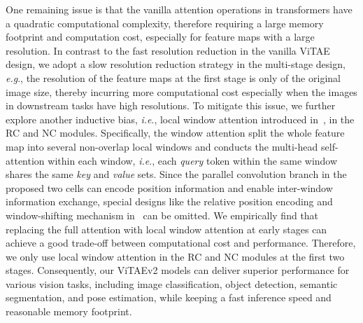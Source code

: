 \documentclass[twocolumn]{svjour3}          \smartqed  \usepackage{natbib}
\newcommand{\ie}{i.e}
\newcommand{\eg}{e.g}
\def\onedot{.\xspace}
\def\eg{\emph{e.g}\onedot}
\def\ie{\emph{i.e}\onedot}
\begin{document}
One remaining issue is that the vanilla attention operations in transformers have a quadratic computational complexity, therefore requiring a large memory footprint and computation cost, especially for feature maps with a large resolution. In contrast to the fast resolution reduction in the vanilla ViTAE design, we adopt a slow resolution reduction strategy in the multi-stage design, \eg, the resolution of the feature maps at the first stage is only  of the original image size, thereby incurring more computational cost especially when the images in downstream tasks have high resolutions. To mitigate this issue, we further explore another inductive bias, \ie, local window attention introduced in~\citep{liu2021swin}, in the RC and NC modules. Specifically, the window attention split the whole feature map into several non-overlap local windows and conducts the multi-head self-attention within each window, \ie, each \textit{query} token within the same window shares the same \textit{key} and \textit{value} sets. Since the parallel convolution branch in the proposed two cells can encode position information and enable inter-window information exchange, special designs like the relative position encoding and window-shifting mechanism in~\citep{liu2021swin} can be omitted. We empirically find that replacing the full attention with local window attention at early stages can achieve a good trade-off between computational cost and performance. Therefore, we only use local window attention in the RC and NC modules at the first two stages. Consequently, our ViTAEv2 models can deliver superior performance for various vision tasks, including image classification, object detection, semantic segmentation, and pose estimation, while keeping a fast inference speed and reasonable memory footprint.
\end{document}
